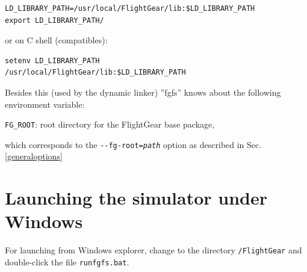 \begin{verbatim}
LD_LIBRARY_PATH=/usr/local/FlightGear/lib:$LD_LIBRARY_PATH
export LD_LIBRARY_PATH/
\end{verbatim}

\noindent
 or on C shell (compatibles):
 
\begin{verbatim}
setenv LD_LIBRARY_PATH
/usr/local/FlightGear/lib:$LD_LIBRARY_PATH
\end{verbatim}

 \noindent
Besides this (used by the dynamic linker) ''fgfs'' knows about the following environment variable:
\noindent

\verb/FG_ROOT/: root directory for the FlightGear base package,

\noindent
 which corresponds to the \texttt{-$ $-fg-root={\it path}} option as described in Sec. \ref{generaloptions}

\section{Launching the simulator under Windows}
For launching \FlightGear{} from Windows explorer, change to the directory \texttt{/FlightGear} and double-click the file \texttt{runfgfs.bat}.
 \medskip

 \centerline{}
\smallskip

